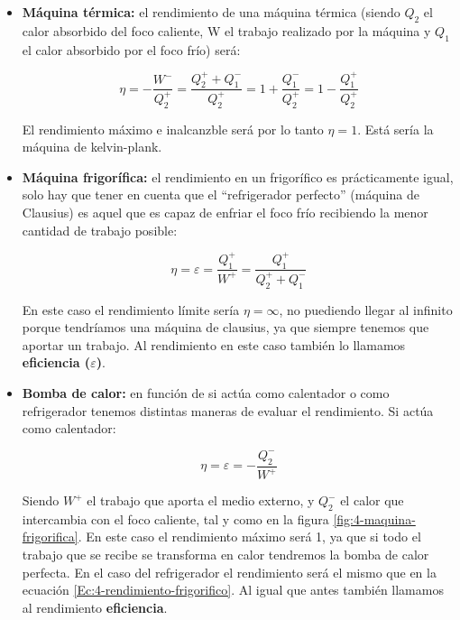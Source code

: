 \documentclass[12pt,a4paper]{article}
\begin{document}
\begin{itemize}
\item \textbf{Máquina térmica:} el rendimiento de una máquina térmica (siendo $Q_2$ el calor absorbido del foco caliente, W el trabajo realizado por la máquina y $Q_1$ el calor absorbido por el foco frío) será:

\begin{equation}
\eta = - \frac{W^-}{Q_2^+} = \frac{Q_2^+ + Q_1^-}{Q_2^+} = 1 + \dfrac{Q_1^-}{Q_2^+} = 1 - \dfrac{Q_1^+}{Q_2^+} \label{eq:4-rendimiento-maquina-termica}
\end{equation}

El rendimiento máximo e inalcanzble será por lo tanto $\eta = 1$. Está sería la máquina de kelvin-plank. \\


\item \textbf{Máquina frigorífica:} el rendimiento en un frigorífico es prácticamente igual, solo hay que tener en cuenta que el ``refrigerador perfecto'' (máquina de Clausius) es aquel que es capaz de enfriar el foco frío recibiendo la menor cantidad de trabajo posible:

\begin{equation}
\eta = \varepsilon = \dfrac{Q_1^+}{W^+}  = \dfrac{Q_1^+}{Q_2^+ + Q_1^-}
\label{Ec:4-rendimiento-frigorifico}
\end{equation}

En este caso el rendimiento límite sería $\eta = \infty$, no puediendo llegar al infinito porque tendríamos una máquina de clausius, ya que siempre tenemos que aportar un trabajo. Al rendimiento en este caso también lo llamamos \textbf{eficiencia ($\varepsilon$)}. \\



\item \textbf{Bomba de calor:} en función de si actúa como calentador o como refrigerador tenemos distintas maneras de evaluar el rendimiento. Si actúa como calentador:

\begin{equation}
\eta = \varepsilon = - \dfrac{Q_2^-}{W^+}
\end{equation}

Siendo $W^+$ el trabajo que aporta el medio externo, y $Q_2^-$ el calor que intercambia con el foco caliente, tal y como en la figura \ref{fig:4-maquina-frigorifica}. En este caso el rendimiento máximo será 1, ya que si todo el trabajo que se recibe se transforma en calor tendremos la bomba de calor perfecta. En el caso del refrigerador el rendimiento será el mismo que en la ecuación \ref{Ec:4-rendimiento-frigorifico}. Al igual que antes también llamamos al rendimiento \textbf{eficiencia}.
 
\end{itemize}
 
\end{document}
